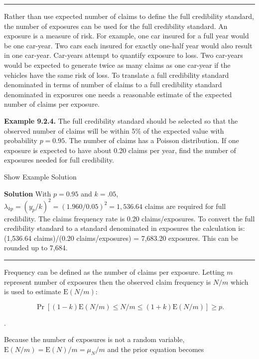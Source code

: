 \documentclass[]{book}
\theoremstyle{definition}
\theoremstyle{definition}
\theoremstyle{definition}
\theoremstyle{remark}
\begin{document}
\begin{center}\rule{0.5\linewidth}{\linethickness}\end{center}

Rather than use expected number of claims to define the full credibility
standard, the number of exposures can be used for the full credibility
standard. An exposure is a measure of risk. For example, one car insured
for a full year would be one car-year. Two cars each insured for exactly
one-half year would also result in one car-year. Car-years attempt to
quantify exposure to loss. Two car-years would be expected to generate
twice as many claims as one car-year if the vehicles have the same risk
of loss. To translate a full credibility standard denominated in terms
of number of claims to a full credibility standard denominated in
exposures one needs a reasonable estimate of the expected number of
claims per exposure.

\textbf{Example 9.2.4.} The full credibility standard should be selected
so that the observed number of claims will be within 5\(\%\) of the
expected value with probability \(p=0.95\). The number of claims has a
Poisson distribution. If one exposure is expected to have about 0.20
claims per year, find the number of exposures needed for full
credibility.

Show Example Solution

\hypertarget{toggleExampleCred.2.4}{}
\textbf{Solution} With \(p=0.95\) and \(k=.05\),
\(\lambda_{kp} = (y_p/k)^{2}=(1.960/0.05)^{2}=1,536.64\) claims are
required for full credibility. The claims frequency rate is 0.20
claims/exposures. To convert the full credibility standard to a standard
denominated in exposures the calculation is: (1,536.64 claims)/(0.20
claims/exposures) = 7,683.20 exposures. This can be rounded up to 7,684.

\begin{center}\rule{0.5\linewidth}{\linethickness}\end{center}

Frequency can be defined as the number of claims per exposure. Letting
\(m\) represent number of exposures then the observed claim frequency is
\(N/m\) which is used to estimate \(\mathrm{E}(N/m)\):

\begin{equation*}
\Pr[(1-k)\mathrm{E}(N/m)\leq N/m \leq(1+k)\mathrm{E}(N/m)] \geq p.
\end{equation*}

.

Because the number of exposures is not a random variable,
\(\mathrm{E}(N/m)=\mathrm{E}(N)/m=\mu_N/m\) and the prior equation
becomes
\end{document}
